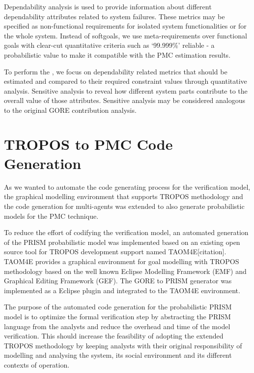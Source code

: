 Dependability analysis is used to provide information about different dependability attributes related to system failures. These metrics may be specified as non-functional requirements for isolated system functionalities or for the whole system. Instead of softgoals, we use meta-requirements over functional goals with clear-cut quantitative criteria such as `99.999\%' reliable - a probabilistic value to make it compatible with the PMC estimation results.

To perform the , we focus on dependability related metrics that should be estimated and compared to their required constraint values through quantitative analysis. Sensitive analysis to reveal how different system parts contribute to the overall value of those attributes. Sensitive analysis may be considered analogous to the original GORE contribution analysis.



\section{TROPOS to PMC Code Generation}

As we wanted to automate the code generating process for the verification model, the graphical modelling environment that supports TROPOS methodology and the code generation for multi-agents was extended to also generate probabilistic models for the PMC technique.

To reduce the effort of codifying the verification model, an automated generation of the PRISM probabilistic model was implemented based on an existing open source tool for TROPOS development support named TAOM4E[citation]. TAOM4E provides a graphical environment for goal modelling with TROPOS methodology based on the well known Eclipse Modelling Framework (EMF) and Graphical Editing Framework (GEF). The GORE to PRISM generator was implemented as a Eclipse plugin and integrated to the TAOM4E environment. 

The purpose  of the automated code generation for the probabilistic PRISM model is to optimize the formal verification step by abstracting the PRISM language from the analysts and reduce the overhead and time of the model verification. This should increase the feasibility of adopting the extended TROPOS methodology by keeping analysts with their original responsibility of modelling and analysing the system, its social environment and its different contexts of operation.






